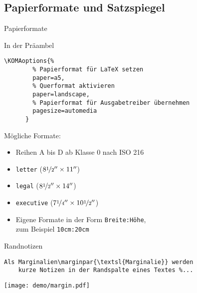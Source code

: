 \subsection{Papierformate und Satzspiegel}

\begin{Frame}[fragile]{Papierformate}
  \begin{Block}{In der Präambel}
    \begin{lstlisting}[gobble=6,style=block]
      \KOMAoptions{%
        % Papierformat für LaTeX setzen
        paper=a5,
        % Querformat aktivieren
        paper=landscape,
        % Papierformat für Ausgabetreiber übernehmen
        pagesize=automedia
      }
    \end{lstlisting}
  \end{Block}

  \xxx

  Mögliche Formate:
  \begin{itemize}
    \item Reihen A bis D ab Klasse 0 nach ISO 216
    \item \lstinline[language={}]-letter- ($8\nicefrac12'' \times 11''$)
    \item \lstinline-legal- ($8\nicefrac12'' \times 14''$)
    \item \lstinline-executive- ($7\nicefrac14'' \times 10\nicefrac12''$)
    \item Eigene Formate in der Form \lstinline-Breite:Höhe-,\\
      zum Beispiel \lstinline-10cm:20cm-
  \end{itemize}
\end{Frame}

\begin{Frame}[t,fragile]{Randnotizen}
  \begin{lstlisting}[gobble=4]
    Als Marginalien\marginpar{\textsl{Marginalie}} werden
    kurze Notizen in der Randspalte eines Textes %...
  \end{lstlisting}

  \begin{center}
    \texttt{[image: demo/margin.pdf]}
  \end{center}
\end{Frame}


